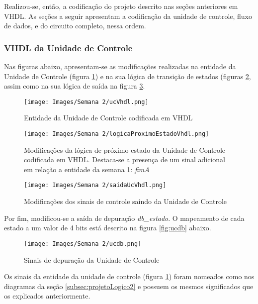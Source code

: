 \documentclass[amsmath,amssymb,floatfix]{report}
\begin{document}
Realizou-se, então, a codificação do projeto descrito nas seções anteriores em VHDL. As seções a seguir apresentam a codificação da unidade de controle, fluxo de dados, e do circuito completo, nessa ordem.

\subsubsection{VHDL da Unidade de Controle}
\label{subsubsec:ucVhdl2}

Nas figuras abaixo, apresentam-se as modificações realizadas na entidade da Unidade de Controle (figura \ref{fig:ucVhdl2}) e na sua lógica de transição de estados (figuras \ref{fig:logicaProximoEstadoVhdl2}, assim como na sua lógica de saída na figura \ref{fig:saidaUcVhdl22}.

\begin{figure}[H]
    \centering
    \texttt{[image: Images/Semana 2/ucVhdl.png]}
    \caption{Entidade da Unidade de Controle codificada em VHDL}
    \label{fig:ucVhdl2}
\end{figure}

\begin{figure}[H]
    \centering
    \texttt{[image: Images/Semana 2/logicaProximoEstadoVhdl.png]}
    \caption{Modificações da lógica de próximo estado da Unidade de Controle codificada em VHDL. Destaca-se a presença de um sinal adicional em relação a entidade da semana 1: \textit{fimA}}
    \label{fig:logicaProximoEstadoVhdl2}
\end{figure}

\begin{figure}[H]
    \centering
    \texttt{[image: Images/Semana 2/saidaUcVhdl.png]}
    \caption{Modificações dos sinais de controle saindo da Unidade de Controle}
    \label{fig:saidaUcVhdl22}
\end{figure}

Por fim, modificou-se a saída de depuração \textit{db\_estado}. O mapeamento de cada estado a um valor de 4 bits está descrito na figura \ref{fig:ucdb} abaixo.

\begin{figure}[H]
    \centering
    \texttt{[image: Images/Semana 2/ucdb.png]}
    \caption{Sinais de depuração da Unidade de Controle}
    \label{fig:ucdb2}
\end{figure}

Os sinais da entidade da unidade de controle (figura \ref{fig:ucVhdl2}) foram nomeados como nos diagramas da seção \ref{subsec:projetoLogico2} e possuem os mesmos significados que os explicados anteriormente.
\end{document}
